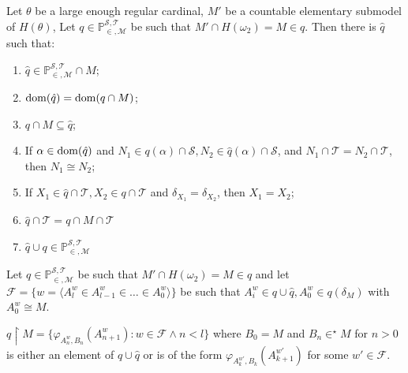 \documentclass[10pt]{beamer}
\newcommand{\fn}{\mathbb{P}_{\in, \mathcal{M}}^{\mathcal{S}, \mathcal{T}}}
\newcommand{\ms}{\mathcal{S}}
\newcommand{\mt}{\mathcal{T}}
\newcommand{\e}{\in^{\star}}
\newcommand{\rest}{{\restriction}}
\newcommand{\dom}{{\rm dom}}
\begin{document}
\begin{frame}
\begin{lemma}
Let $\theta$ be a large enough regular cardinal, $M'$ be a countable elementary submodel of $H(\theta)$, Let $q \in  \fn$ be such that $M' \cap H(\omega_2)=M \in q$. Then there is $\hat{q}$ such that:
\vspace{-2mm}
\begin{enumerate}
\item [$(1)$]
$\hat{q} \in \fn \cap M$;
\vspace{-2mm}
\item [$(2)$]
$\dom(\hat{q})= \dom(q \cap M)$;
\vspace{-2mm}
\item [$(3)$]
$q \cap M \subseteq \hat{q}$;
\vspace{-2mm}
\item [$(4)$]
If $\alpha \in \dom(\hat{q})$ and $N_1 \in q(\alpha) \cap \ms, N_2 \in \hat{q}(\alpha) \cap \ms$, and $N_1 \cap \mt = N_2 \cap \mt$, then $N_1 \cong N_2$;
\vspace{-2mm}
\item [$(5)$]
If $X_1 \in \hat{q} \cap \mt, X_2 \in q \cap \mt$ and $\delta_{X_1}= \delta_{X_2}$, then $X_1=X_2$;
\vspace{-2mm}
\item [$(6)$]
$\hat{q} \cap \mt = q \cap M \cap \mt$
\vspace{-2mm}
\item[$(7)$]
$\hat{q} \cup q \in \fn$
\end{enumerate}
\end{lemma}
\end{frame}
\begin{frame}
Let $q \in  \fn $ be such that $M' \cap H(\omega_2)=M \in q$ and let $\mathcal{F}= \{ w= \langle A_l^w \in A_{l-1}^w \in \dots \in A_0^w \rangle \}$ be such that $A_i^w \in q \cup \hat{q}, A_0^w \in q(\delta_M)$ with $A_0^w \cong M$.
\begin{block}

$q \rest M = \{ \varphi_{A_n^w,B_n}(A_{n+1}^w): w \in \mathcal{F} \land n<l \}$ where $B_0 = M$ and $B_n \e M$ for $n>0$ is either an element of  $q \cup \hat{q}$ or is of the form $\varphi_{A_k^{w'},B_k}(A_{k+1}^{w'})$ for  some $w' \in \mathcal{F}$.
\end{block}
\end{frame}
\end{document}
